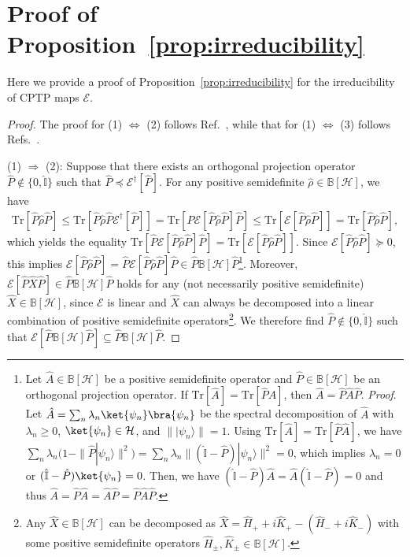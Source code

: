 \documentclass[preprint,pteplogo]{ptephy_v2}%
\numberwithin{equation}{section}
\theoremstyle{definition}
\newcommand{\mc}[1]{\mathcal{#1}}
\newcommand{\mr}[1]{\mathrm{#1}}
\newcommand{\mbb}[1]{\mathbb{#1}}
\newcommand{\Tr}{\mr{Tr}}
\begin{document}
\section{Proof of Proposition~\ref{prop:irreducibility}}
\label{app:ProofIrreducibility}

Here we provide a proof of Proposition~\ref{prop:irreducibility} for the irreducibility of CPTP maps $\mc{E}$.

\begin{proof}
The proof for (1) $\Leftrightarrow$ (2) follows Ref.~\cite{carbone2016open}, while that for (1) $\Leftrightarrow$ (3) follows Refs.~\cite{evans1978spectral, wolf2012quantum}.

(1) $\Rightarrow$ (2): 
Suppose that there exists an orthogonal projection operator $\hat{P} \notin \{ 0, \hat{\mbb{I}}\}$ such that $\hat{P} \preceq \mc{E}^\dagger[\hat{P}]$.
For any positive semidefinite $\hat{\rho} \in \mbb{B}[\mc{H}]$, we have 
\begin{align}
\Tr[\hat{P} \hat{\rho} \hat{P}] 
\leq \Tr[\hat{P} \hat{\rho} \hat{P} \mc{E}^\dagger[\hat{P}]] 
= \Tr[\hat{P} \mc{E}[\hat{P} \hat{\rho} \hat{P}] \hat{P}] 
\leq \Tr[\mc{E}[\hat{P} \hat{\rho} \hat{P}]]
= \Tr[\hat{P} \hat{\rho} \hat{P}],
\end{align}
which yields the equality $\Tr[\hat{P} \mc{E}[\hat{P} \hat{\rho} \hat{P}] \hat{P}] = \Tr[\mc{E}[\hat{P} \hat{\rho} \hat{P}]]$. 
Since $\mc{E}[\hat{P} \hat{\rho} \hat{P}] \succeq 0$,
this implies $\mc{E}[\hat{P} \hat{\rho} \hat{P}] = \hat{P} \mc{E}[\hat{P} \hat{\rho} \hat{P}] \hat{P} \in \hat{P} \mbb{B}[\mc{H}] \hat{P}$\footnote{
Let $\hat{A} \in \mbb{B}[\mc{H}]$ be a positive semidefinite operator and $\hat{P} \in \mbb{B}[\mc{H}]$ be an orthogonal projection operator. 
If $\Tr[\hat{A}] = \Tr[\hat{P} \hat{A}]$, then $\hat{A} = \hat{P} \hat{A} \hat{P}$. 
\textit{Proof}. Let $\hat{A} = \sum_n \lambda_n \ket{\psi_n} \bra{\psi_n}$ be the spectral decomposition of $\hat{A}$ with $\lambda_n \geq 0$, $\ket{\psi_n} \in \mc{H}$, and $\| |\psi_n \rangle \|=1$.
Using $\Tr[\hat{A}]=\Tr[\hat{P} \hat{A}]$, we have $\sum_n \lambda_n (1- \| \hat{P} | \psi_n \rangle \|^2) = \sum_n \lambda_n \| (\hat{\mathbb{I}}-\hat{P}) | \psi_n \rangle \|^2 = 0$, which implies $\lambda_n = 0$ or $(\hat{\mbb{I}}-\hat{P}) \ket{\psi_n}=0$.
Then, we have $(\hat{\mbb{I}}-\hat{P}) \hat{A} = \hat{A} (\hat{\mbb{I}}-\hat{P})=0$ and thus $\hat{A} = \hat{P} \hat{A}=\hat{A} \hat{P} = \hat{P} \hat{A} \hat{P}$.
}.
Moreover, $\mc{E}[\hat{P} \hat{X} \hat{P}] \in \hat{P} \mbb{B}[\mc{H}] \hat{P}$ holds for any (not necessarily positive semidefinite) $\hat{X} \in \mbb{B}[\mc{H}]$, since $\mc{E}$ is linear and $\hat{X}$ can always be decomposed into a linear combination of positive semidefinite operators\footnote{
Any $\hat{X} \in \mbb{B}[\mc{H}]$ can be decomposed as $\hat{X} = \hat{H}_+ + i\hat{K}_+ -(\hat{H}_- + i\hat{K}_-)$ with some positive semidefinite operators $\hat{H}_\pm, \hat{K}_\pm \in \mbb{B}[\mc{H}]$.
}. 
We therefore find $\hat{P} \notin \{ 0, \hat{\mbb{I}} \}$ such that $\mc{E}[\hat{P} \mbb{B}[\mc{H}] \hat{P}] \subseteq \hat{P} \mbb{B}[\mc{H}] \hat{P}$.


\end{proof}
\end{document}
